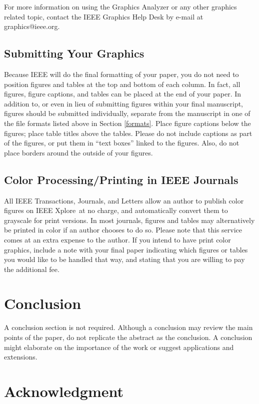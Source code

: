 \documentclass[journal]{IEEEtran}
\begin{document}
For more information on using the Graphics Analyzer or any other graphics related topic, contact the IEEE Graphics Help Desk by e-mail at graphics@ieee.org.

\subsection{Submitting Your Graphics}
Because IEEE will do the final formatting of your paper, you do not need to position figures and tables at the top and bottom of each column. In fact, all figures, figure captions, and tables can be placed at the end of your paper. In addition to, or even in lieu of submitting figures within your final manuscript, figures should be submitted individually, separate from the manuscript in one of the file formats listed above in 
Section \ref{formats}. Place figure captions below the figures; place table titles above the tables. Please do not include captions as part of the figures, or put them in ``text boxes'' linked to the figures. Also, do not place borders around the outside of your figures. %

\subsection{Color Processing/Printing in IEEE Journals}
All IEEE Transactions, Journals, and Letters allow an author to publish color figures on IEEE Xplore\textregistered\ at no charge, and automatically convert them to grayscale for print versions. In most journals, figures and tables may alternatively be printed in color if an author chooses to do so. Please note that this service comes at an extra expense to the author. If you intend to have print color graphics, include a note with your final paper indicating which figures or tables you would like to be handled that way, and stating that you are willing to pay the additional fee.


\section{Conclusion}

A conclusion section is not required. Although a conclusion may review the main points of the paper, do not replicate the abstract as the conclusion. A conclusion might elaborate on the importance of the work or suggest applications and extensions. 
\section*{Acknowledgment}
\end{document}
